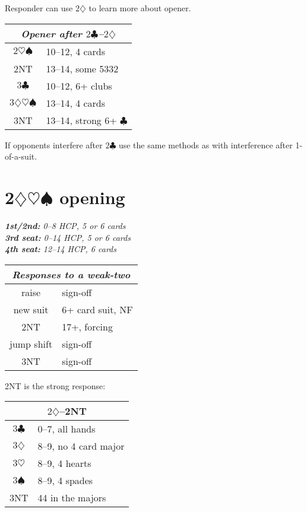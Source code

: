 \documentclass[a4paper, twoside, 11pt]{article}
\begin{document}
\begin{multicols}{3}
Responder can use $2\diamondsuit$ to learn more about opener.
\begin{center}
\begin{tabular}{ |c|l| }
 \hline
 \multicolumn{2}{|c|}{\textit{Opener after $2\clubsuit$--$2\diamondsuit$}} \\
 \hline
 $2\heartsuit\spadesuit$ & 10--12, 4 cards\\
 \textnormal{2NT} &  13--14, some 5332 \\
$3\clubsuit$ & 10--12, 6+ clubs\\
 $3\diamondsuit\heartsuit\spadesuit$ & 13--14, 4 cards \\
 \textnormal{3NT} & 13--14, strong 6+ $\clubsuit$ \\
 \hline
\end{tabular}
\end{center}

If opponents interfere after $2\clubsuit$ use the same methods as with interference after 1-of-a-suit.

\section{2$\diamondsuit\heartsuit\spadesuit$ opening}

\emph{\textbf{1st/2nd:} 0--8 HCP, 5 or 6 cards \\ \textbf{3rd seat:} 0--14 HCP, 5 or 6 cards \\ \textbf{4th seat:} 12--14 HCP, 6 cards}

\begin{center}
\begin{tabular}{ |c|l| }
 \hline
 \multicolumn{2}{|c|}{\textit{Responses to a weak-two}} \\
 \hline
 raise & sign-off\\
 new suit & 6+ card suit, NF  \\
\textnormal{2NT} & 17+, forcing \\
 jump shift & sign-off \\
 \textnormal{3NT} & sign-off \\
 \hline
\end{tabular}
\end{center}

\textnormal{2NT} is the strong response:
\begin{center}
\begin{tabular}{ |c|l| }
 \hline
 \multicolumn{2}{|c|}{$2\diamondsuit$--\textnormal{2NT}} \\
 \hline
$3\clubsuit$ & 0--7, all hands\\
$3\diamondsuit$ & 8--9, no 4 card major \\
$3\heartsuit$ & 8--9, 4 hearts \\
$3\spadesuit$ & 8--9, 4 spades \\
 \textnormal{3NT} & 44 in the majors \\
 \hline
\end{tabular}
\end{center}


\end{multicols}
\end{document}
